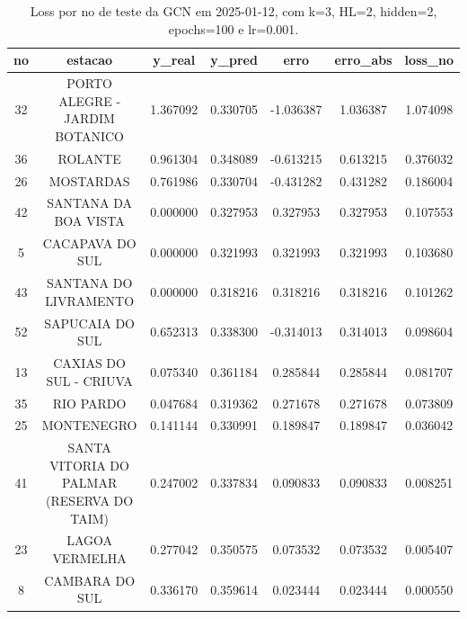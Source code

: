 \begin{table}[h]
\centering
\caption{Loss por no de teste da GCN em 2025-01-12, com k=3, HL=2, hidden=2, epochs=100 e lr=0.001.}
\label{tab:gcn_loss_k3_hl2_h2_e100_d20250112}
\begin{tabular}{ccccccc}
\toprule
no & estacao & y\_real & y\_pred & erro & erro\_abs & loss\_no \\
\midrule
32 & PORTO ALEGRE - JARDIM BOTANICO & 1.367092 & 0.330705 & -1.036387 & 1.036387 & 1.074098 \\
36 & ROLANTE & 0.961304 & 0.348089 & -0.613215 & 0.613215 & 0.376032 \\
26 & MOSTARDAS & 0.761986 & 0.330704 & -0.431282 & 0.431282 & 0.186004 \\
42 & SANTANA DA BOA VISTA & 0.000000 & 0.327953 & 0.327953 & 0.327953 & 0.107553 \\
5 & CACAPAVA DO SUL & 0.000000 & 0.321993 & 0.321993 & 0.321993 & 0.103680 \\
43 & SANTANA DO LIVRAMENTO & 0.000000 & 0.318216 & 0.318216 & 0.318216 & 0.101262 \\
52 & SAPUCAIA DO SUL & 0.652313 & 0.338300 & -0.314013 & 0.314013 & 0.098604 \\
13 & CAXIAS DO SUL - CRIUVA & 0.075340 & 0.361184 & 0.285844 & 0.285844 & 0.081707 \\
35 & RIO PARDO & 0.047684 & 0.319362 & 0.271678 & 0.271678 & 0.073809 \\
25 & MONTENEGRO & 0.141144 & 0.330991 & 0.189847 & 0.189847 & 0.036042 \\
41 & SANTA VITORIA DO PALMAR (RESERVA DO TAIM) & 0.247002 & 0.337834 & 0.090833 & 0.090833 & 0.008251 \\
23 & LAGOA VERMELHA & 0.277042 & 0.350575 & 0.073532 & 0.073532 & 0.005407 \\
8 & CAMBARA DO SUL & 0.336170 & 0.359614 & 0.023444 & 0.023444 & 0.000550 \\
\bottomrule
\end{tabular}
\end{table}
